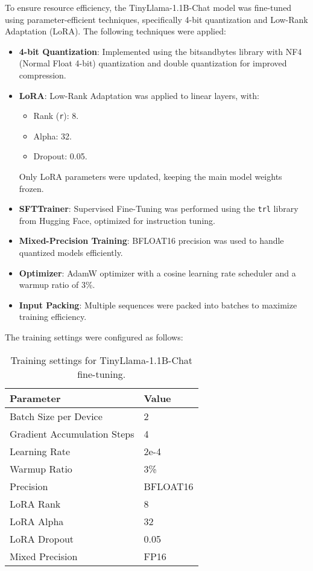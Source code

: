 \documentclass[11pt]{article}
\begin{document}
To ensure resource efficiency, the TinyLlama-1.1B-Chat model was fine-tuned using parameter-efficient techniques, specifically 4-bit quantization and Low-Rank Adaptation (LoRA). The following techniques were applied:



\begin{itemize}
    \item \textbf{4-bit Quantization}: Implemented using the bitsandbytes library with NF4 (Normal Float 4-bit) quantization and double quantization for improved compression.
    \item \textbf{LoRA}: Low-Rank Adaptation was applied to linear layers, with:
        \begin{itemize}
            \item Rank (\texttt{r}): 8.
            \item Alpha: 32.
            \item Dropout: 0.05.
        \end{itemize}
        Only LoRA parameters were updated, keeping the main model weights frozen.
    \item \textbf{SFTTrainer}: Supervised Fine-Tuning was performed using the \texttt{trl} library from Hugging Face, optimized for instruction tuning.
    \item \textbf{Mixed-Precision Training}: BFLOAT16 precision was used to handle quantized models efficiently.
    \item \textbf{Optimizer}: AdamW optimizer with a cosine learning rate scheduler and a warmup ratio of 3\%.
    \item \textbf{Input Packing}: Multiple sequences were packed into batches to maximize training efficiency.
\end{itemize}

The training settings were configured as follows:

\begin{table}[h]
\centering
\begin{tabular}{ll}
\toprule
\textbf{Parameter} & \textbf{Value} \\
\midrule
Batch Size per Device & 2 \\
Gradient Accumulation Steps & 4 \\
Learning Rate & 2e-4 \\
Warmup Ratio & 3\% \\
Precision & BFLOAT16 \\
LoRA Rank & 8 \\
LoRA Alpha & 32 \\
LoRA Dropout & 0.05 \\
Mixed Precision & FP16 \\
\bottomrule
\end{tabular}
\caption{Training settings for TinyLlama-1.1B-Chat fine-tuning.}
\label{tab:tinyllama-training-settings}
\end{table}
\end{document}
